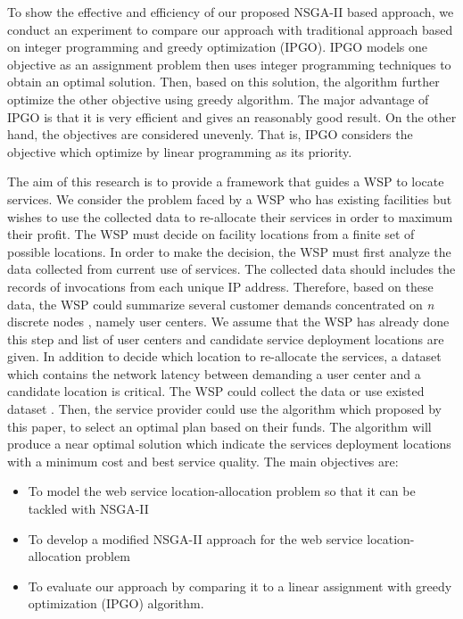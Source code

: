 \documentclass{llncs}
\begin{document}
To show the effective and efficiency of our proposed NSGA-II based approach, we conduct an experiment to compare our approach with
traditional approach based on integer programming and greedy optimization (IPGO). IPGO models one objective as an assignment problem then uses integer programming techniques to 
obtain an optimal solution. Then, based on this solution, the algorithm further optimize the other objective using greedy algorithm. 
The major advantage of IPGO is that it is very efficient and gives 
an reasonably good result. On the other hand, the objectives are considered unevenly. That is, IPGO considers the objective which optimize by linear programming as its priority.


The aim of this research is to provide a framework that guides a WSP to locate services.
We consider the problem faced by a WSP who has existing facilities but wishes to use the collected data to re-allocate their services in order to maximum their profit.
The WSP must decide on facility locations from a finite set of possible locations. 
In order to make the decision, the WSP must first analyze the data collected from current use of services. 
The collected data should includes the records of invocations from each unique IP address.
Therefore, based on these data, the WSP could summarize several customer demands concentrated on \textit{n} discrete nodes \cite{Aboolian}, namely user centers. 
We assume that the WSP has already done this step and list of user centers and candidate service deployment locations are given.
In addition to decide which location to re-allocate the services, a dataset which contains the network latency between demanding a user center and a candidate location is critical. 
The WSP could collect the data or use existed dataset  \cite{6076756} \cite{5552800}. 
Then, the service provider could use the algorithm which proposed by this paper, to select an optimal plan based on their funds. 
The algorithm will produce a near optimal solution which indicate the services deployment locations with a minimum cost and best service quality.
The main objectives are:
\begin{itemize}
	\item To model the web service location-allocation problem so that it can be tackled with NSGA-II
	\item To develop a modified NSGA-II approach for the web service location-allocation problem
	\item To evaluate our approach by comparing it to a linear assignment with greedy optimization (IPGO) algorithm.
\end{itemize}
\end{document}
